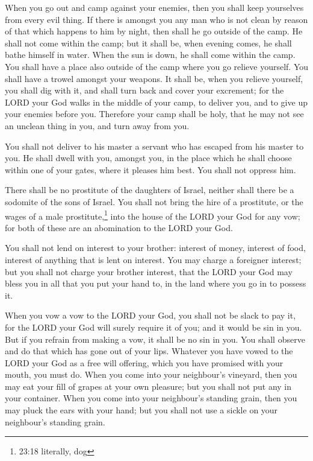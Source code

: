  When you go out and camp against your enemies, then you
shall keep yourselves from every evil thing.  If there is
amongst you any man who is not clean by reason of that which happens to
him by night, then shall he go outside of the camp. He shall not come
within the camp;  but it shall be, when evening comes, he
shall bathe himself in water. When the sun is down, he shall come within
the camp.  You shall have a place also outside of the camp
where you go relieve yourself.  You shall have a trowel
amongst your weapons. It shall be, when you relieve yourself, you shall
dig with it, and shall turn back and cover your excrement; 
for the LORD your God walks in the middle of your camp, to deliver you,
and to give up your enemies before you. Therefore your camp shall be
holy, that he may not see an unclean thing in you, and turn away from
you.

 You shall not deliver to his master a servant who has
escaped from his master to you.  He shall dwell with you,
amongst you, in the place which he shall choose within one of your
gates, where it pleases him best. You shall not oppress him.

 There shall be no prostitute of the daughters of Israel,
neither shall there be a sodomite of the sons of Israel. 
You shall not bring the hire of a prostitute, or the wages of a male
prostitute,\footnote{23:18 literally, dog} into the house of the LORD
your God for any vow; for both of these are an abomination to the LORD
your God.

 You shall not lend on interest to your brother: interest
of money, interest of food, interest of anything that is lent on
interest.  You may charge a foreigner interest; but you
shall not charge your brother interest, that the LORD your God may bless
you in all that you put your hand to, in the land where you go in to
possess it.

 When you vow a vow to the LORD your God, you shall not be
slack to pay it, for the LORD your God will surely require it of you;
and it would be sin in you.  But if you refrain from making
a vow, it shall be no sin in you.  You shall observe and do
that which has gone out of your lips. Whatever you have vowed to the
LORD your God as a free will offering, which you have promised with your
mouth, you must do.  When you come into your neighbour's
vineyard, then you may eat your fill of grapes at your own pleasure; but
you shall not put any in your container.  When you come
into your neighbour's standing grain, then you may pluck the ears with
your hand; but you shall not use a sickle on your neighbour's standing
grain.

